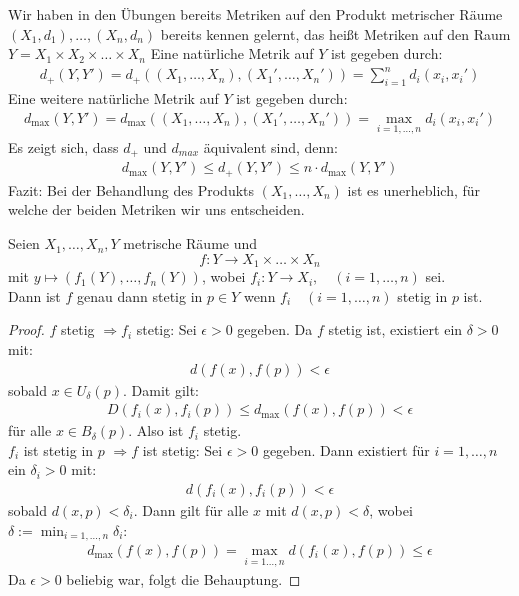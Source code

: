 \begin{Einschub}{
	Wir haben in den Übungen bereits Metriken auf den Produkt metrischer Räume 
	$(X_1,d_1) , \hdots, (X_n, d_n)$ bereits kennen gelernt, das heißt
	Metriken auf den Raum $Y= X_1 \times X_2 \times \hdots \times X_n$
	Eine natürliche Metrik auf $Y$ ist gegeben durch:
	\begin{align*}
		d_+ (Y,Y') = d_+ ((X_1, \hdots, X_n), (X_1', \hdots, X_n')) 
		= \sum_{i = 1}^n d_i(x_i,x_i')
	\end{align*}
	Eine weitere natürliche Metrik auf $Y$ ist gegeben durch:
	\begin{align*}
		d_{\max}(Y,Y') = d_{\max}((X_1, \hdots, X_n),(X_1', \hdots, 
			X_n')) = \max_{i=1, \hdots, n} d_i(x_i,x_i')
	\end{align*}
	Es zeigt sich, dass $d_+$ und $d_{max}$ äquivalent sind, denn:
	\begin{align*}
		d_{\max} (Y, Y') \leq d_+(Y, Y') \leq n \cdot d_{\max} 
		(Y, Y')
	\end{align*}
	Fazit: Bei der Behandlung des Produkts $(X_1, \hdots, X_n)$ ist es unerheblich, 
	für welche der beiden Metriken wir uns entscheiden.
}\end{Einschub}

\begin{Proposition}{%
	Seien $X_1, \hdots, X_n, Y$ metrische Räume und 
		$$f: Y \rightarrow X_1 \times \hdots \times X_n$$ mit $y \mapsto (f_1(Y), \hdots, f_n(Y))$,
		 wobei 
	$f_i: Y \rightarrow X_i, \quad (i = 1, \hdots, n)$ sei. \\
	Dann ist $f$ genau dann stetig in $p \in Y$ wenn $f_i \quad (i= 1, \hdots, n)$
	stetig in $p$ ist.
}\end{Proposition}

\begin{proof}
	\glqq $f$ stetig $\Rightarrow f_i$ stetig\grqq{}:
	Sei $\epsilon > 0$ gegeben. Da $f$ stetig ist, existiert ein $\delta > 0$ mit:
	\begin{align*}
		d(f(x),f(p)) < \epsilon
	\end{align*}
	sobald $x \in U_\delta (p)$. Damit gilt:
	\begin{align*}
		D(f_i(x),f_i(p)) \leq d_{\max} (f(x), f(p)) < \epsilon
	\end{align*}
	für alle $x \in B_\delta(p)$. Also ist $f_i$ stetig.\\
	\glqq $f_i$ ist stetig in $p$ $\Rightarrow f$ ist stetig\grqq{}:
	Sei $\epsilon > 0$ gegeben. Dann existiert für \newline $i = 1, \hdots, n$ ein 
	$\delta_i > 0$ mit: 
	\begin{align*}
		d(f_i(x),f_i(p))< \epsilon
	\end{align*}
	sobald $d(x,p) < \delta_i$. Dann gilt für alle $x$ mit $d(x,p) <\delta$, wobei 
	$\delta := \min_{i = 1, \hdots, n} \delta_i$:
	\begin{align*}
		d_{\max}(f(x),f(p)) = \max_{i=1\hdots,n} d(f_i(x),f(p)) \leq \epsilon
	\end{align*}
	Da $\epsilon > 0$ beliebig war, folgt die Behauptung.
\end{proof}

